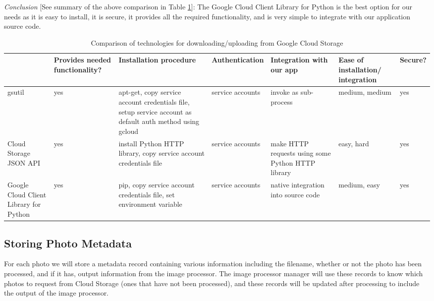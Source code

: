 \documentclass[10pt, onecolumn, draftclsnofoot, letterpaper, compsoc]{IEEEtran}
\begin{document}
\textit{Conclusion} [See summary of the above comparison in Table \ref{table:bret1}]:
The Google Cloud Client Library for Python is the best
option for our needs as it is easy to install, it is secure, it provides all the
required functionality, and is very simple to integrate with our application 
source code.

\begin{table}[h]
\centering
\caption{Comparison of technologies for downloading/uploading from Google Cloud Storage}
\begin{tabular}{|p{1.8cm}|p{1.4cm}|p{3cm}|p{1.8cm}|p{1.8cm}|p{1.8cm}|p{1cm}|}
\cline{4-4}
\hline

 & Provides needed functionality? & Installation procedure & Authentication 
 & Integration with our app & Ease of installation/ integration & Secure? \\ \hline

gsutil & yes & apt-get, copy service account credentials file, setup service 
account as default auth method using gcloud & service accounts & invoke as 
sub-process & medium, medium & yes \\ \hline

Cloud Storage JSON API & yes & install Python HTTP library, copy service 
account credentials file & service accounts & make HTTP requests using 
some Python HTTP library & easy, hard & yes \\ \hline

Google Cloud Client Library for Python & yes & pip, copy service account 
credentials file, set environment variable & service accounts & native 
integration into source code & medium, easy & yes \\ \hline

\end{tabular}
\label{table:bret1}
\end{table}

\subsection{Storing Photo Metadata}

For each photo we will store a metadata record containing various information 
including the filename, whether or not the photo has been processed, and if it 
has, output information from the image processor. The image processor manager
will use these records to know which photos to request from Cloud Storage 
(ones that have not been processed), and these records will be updated after 
processing to include the output of the image processor.
\end{document}

